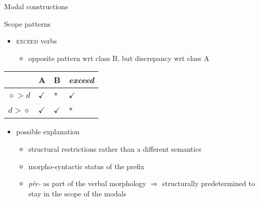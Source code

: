 \documentclass[12pt]{beamer}
\begin{document}
\begin{frame}{Modal constructions}

Scope patterns

\begin{itemize}
\item \textsc{exceed} verbs
\begin{itemize}
\item opposite pattern wrt class B, but discrepancy wrt class A
\end{itemize}
\end{itemize}

\begin{table}[]
\centering
\label{table-scope-a-b-exceed}
\begin{tabular}{@{}llll@{}}
\toprule
                          & A      & B      & \textit{exceed}  \\ \midrule
$\diamond > d$ & $\checkmark$ & *      & $\checkmark$ \\
$d > \diamond$ & $\checkmark$ & $\checkmark$ & *      \\ \bottomrule
\end{tabular}
\end{table}

\begin{itemize}
\item possible explanation
\begin{itemize}
\item structural restrictions rather than a different semantics
\item morpho-syntactic status of the prefix
\item \textit{pře-} as part of the verbal morphology $\Rightarrow$ structurally predetermined to stay in the scope of the modals
\end{itemize}

\end{itemize}



\end{frame}
		
\end{document}
